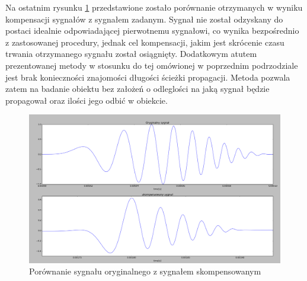 Na ostatnim rysunku \ref{fig:przedipo2} przedstawione zostało porównanie otrzymanych w wyniku kompensacji sygnałów z sygnałem zadanym. Sygnał nie został odzyskany do postaci idealnie odpowiadającej pierwotnemu sygnałowi, co wynika bezpośrednio z zastosowanej procedury, jednak cel kompensacji, jakim jest skrócenie czasu trwania otrzymanego sygnału został osiągnięty. Dodatkowym atutem prezentowanej metody w stosunku do tej omówionej w poprzednim podrzodziale jest brak konieczności znajomości długości ścieżki propagacji. Metoda pozwala zatem na badanie obiektu bez założeń o odleglości na jaką sygnał będzie propagował oraz ilości jego odbić w obiekcie.
\begin{figure}[h]
\centering
\includegraphics[width=13cm]{Zdjecia/4/przedipo2}
\caption{Porównanie sygnału oryginalnego z sygnałem skompensowanym}
\label{fig:przedipo2}
\end{figure}
